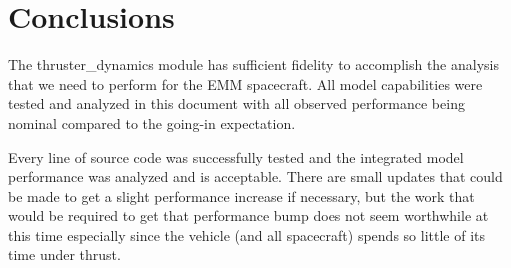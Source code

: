 \documentclass[]{LASPreport}
\begin{document}
\section{Conclusions}
The thruster\_dynamics module has sufficient fidelity to accomplish the analysis 
that we need to perform for the EMM spacecraft.  All model capabilities were 
tested and analyzed in this document with all observed performance being nominal 
compared to the going-in expectation.  

Every line of source code was successfully tested and the integrated model 
performance was analyzed and is acceptable.  There are small updates that could 
be made to get a slight performance increase if necessary, but the work that 
would be required to get that performance bump does not seem worthwhile at this 
time especially since the vehicle (and all spacecraft) spends so little of its 
time under thrust.
\end{document}
